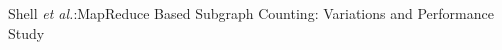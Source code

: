 %
{Shell \MakeLowercase{\textit{et al.}}:MapReduce Based Subgraph Counting:
Variations and Performance Study}

% 









